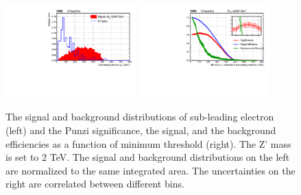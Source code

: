 \begin{figure}[htbp]
   \centering
   \includegraphics[width=0.45\textwidth]{optimization/plot_2nd_pt/plot_2nd_pt_input_in_Zprime_mass_2000.pdf}
   \includegraphics[width=0.45\textwidth]{optimization/plot_2nd_pt/plot_2nd_pt_Significance_and_efficiency_for_Zprme_M_2000.pdf}
   \caption{The signal and background distributions of sub-leading electron \pt 
(left) and the Punzi significance, the signal, and the background efficiencies as a 
 function of minimum \pt threshold (right). The Z' mass is set to 2 TeV. The 
   signal and background distributions on the left are normalized to the same 
   integrated area. The uncertainties on the right are correlated between 
 different bins.}
   \label{fig:subpttwo}
\end{figure}

